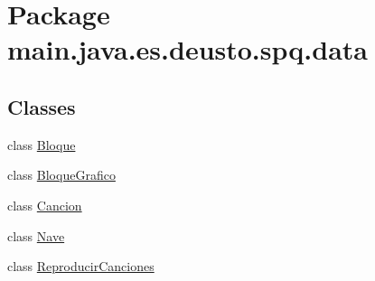 \hypertarget{namespacemain_1_1java_1_1es_1_1deusto_1_1spq_1_1data}{}\section{Package main.\+java.\+es.\+deusto.\+spq.\+data}
\label{namespacemain_1_1java_1_1es_1_1deusto_1_1spq_1_1data}
\subsection*{Classes}
\begin{DoxyCompactItemize}
\item 
class \hyperlink{classmain_1_1java_1_1es_1_1deusto_1_1spq_1_1data_1_1_bloque}{Bloque}
\item 
class \hyperlink{classmain_1_1java_1_1es_1_1deusto_1_1spq_1_1data_1_1_bloque_grafico}{Bloque\+Grafico}
\item 
class \hyperlink{classmain_1_1java_1_1es_1_1deusto_1_1spq_1_1data_1_1_cancion}{Cancion}
\item 
class \hyperlink{classmain_1_1java_1_1es_1_1deusto_1_1spq_1_1data_1_1_nave}{Nave}
\item 
class \hyperlink{classmain_1_1java_1_1es_1_1deusto_1_1spq_1_1data_1_1_reproducir_canciones}{Reproducir\+Canciones}
\end{DoxyCompactItemize}

